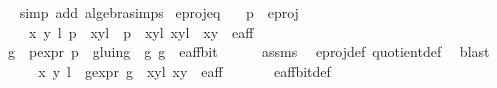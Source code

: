 \begin{isabellebody}
\ \ \isamarkupfalse%
{\isacharparenleft}simp\ add{\isacharcolon}\ algebra{\isacharunderscore}simps{\isacharparenright}%
\endisatagproof
{\isafoldproof}%
%
\isadelimproof
\isanewline
%
\endisadelimproof
\isanewline
{}\isamarkupfalse%
\ e{\isacharunderscore}proj{\isacharunderscore}eq{\isacharcolon}\isanewline
\ \ \ {\isachardoublequoteopen}p\ {\isasymin}\ e{\isacharunderscore}proj{\isachardoublequoteclose}\isanewline
\ \ \ {\isachardoublequoteopen}{\isasymexists}\ x\ y\ l{\isachardot}\ {\isacharparenleft}p\ {\isacharequal}\ {\isacharbraceleft}{\isacharparenleft}{\isacharparenleft}x{\isacharcomma}y{\isacharparenright}{\isacharcomma}l{\isacharparenright}{\isacharbraceright}\ {\isasymor}\ p\ {\isacharequal}\ {\isacharbraceleft}{\isacharparenleft}{\isacharparenleft}x{\isacharcomma}y{\isacharparenright}{\isacharcomma}l{\isacharparenright}{\isacharcomma}{\isacharparenleft}{\isasymtau}\ {\isacharparenleft}x{\isacharcomma}y{\isacharparenright}{\isacharcomma}l{\isacharplus}{}{\isacharparenright}{\isacharbraceright}{\isacharparenright}\ {\isasymand}\ {\isacharparenleft}x{\isacharcomma}y{\isacharparenright}\ {\isasymin}\ e{\isacharunderscore}aff{\isachardoublequoteclose}\ \ \ \ \ \ \ \ \isanewline
%
\isadelimproof
%
\endisadelimproof
%
\isatagproof
{}\isamarkupfalse%
\ {\isacharminus}\isanewline
\ \ \isamarkupfalse%
\ g\ \ p{\isacharunderscore}expr{\isacharcolon}\ {\isachardoublequoteopen}p\ {\isacharequal}\ gluing\ {\isacharbackquote}{\isacharbackquote}\ {\isacharbraceleft}g{\isacharbraceright}{\isachardoublequoteclose}\ {\isachardoublequoteopen}g\ {\isasymin}\ e{\isacharunderscore}aff{\isacharunderscore}bit{\isachardoublequoteclose}\isanewline
\ \ \ \ \isamarkupfalse%
\ assms\ \isamarkupfalse%
\ e{\isacharunderscore}proj{\isacharunderscore}def\ quotient{\isacharunderscore}def\ \isamarkupfalse%
\ blast{\isacharplus}\isanewline
\ \ \isamarkupfalse%
\ \isamarkupfalse%
\ x\ y\ l\ \ g{\isacharunderscore}expr{\isacharcolon}\ {\isachardoublequoteopen}g\ {\isacharequal}\ {\isacharparenleft}{\isacharparenleft}x{\isacharcomma}y{\isacharparenright}{\isacharcomma}l{\isacharparenright}{\isachardoublequoteclose}\ {\isachardoublequoteopen}{\isacharparenleft}x{\isacharcomma}y{\isacharparenright}\ {\isasymin}\ e{\isacharunderscore}aff{\isachardoublequoteclose}\ \isanewline
\ \ \ \ \isamarkupfalse%
\ e{\isacharunderscore}aff{\isacharunderscore}bit{\isacharunderscore}def\ \isamarkupfalse%

\end{isabellebody}
